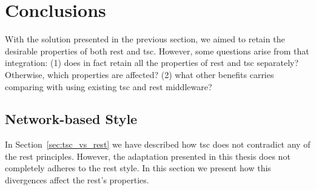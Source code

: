 \section{Conclusions}

With the solution presented in the previous section, we aimed to retain the desirable properties of both \ac{rest} and \ac{tsc}.
However, some questions arise from that integration:
(1) does in fact retain all the properties of \ac{rest} and \ac{tsc} separately? Otherwise, which properties are affected?
(2) what other benefits carries comparing with using existing \ac{tsc} and \ac{rest} middleware?



\subsection{Network-based Style} %
\label{sec:network_properties}

In Section~\ref{sec:tsc_vs_rest} we have described how \ac{tsc} does not contradict any of the \ac{rest} principles.
However, the adaptation presented in this thesis does not completely adheres to the \ac{rest} style.
In this section we present how this divergences affect the \ac{rest}'s properties.


